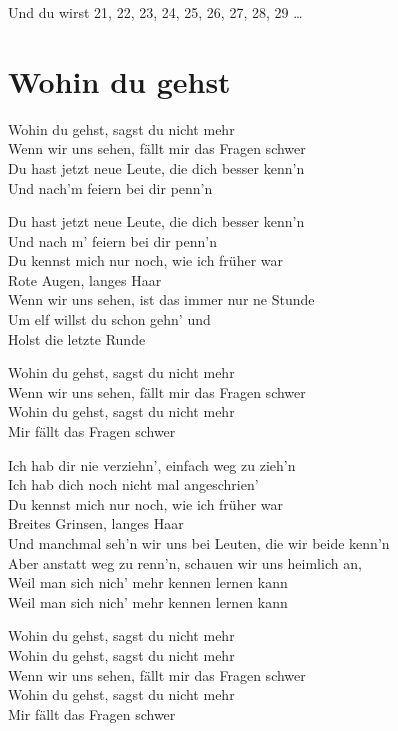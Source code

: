 \documentclass[]{book}
\begin{document}
Und du wirst 21, 22, 23, 24, 25, 26, 27, 28, 29 \ldots{}

\hypertarget{wohin-du-gehst-2}{%
\section{Wohin du gehst}\label{wohin-du-gehst-2}}

Wohin du gehst, sagst du nicht mehr\\
Wenn wir uns sehen, fällt mir das Fragen schwer\\
Du hast jetzt neue Leute, die dich besser kenn'n\\
Und nach'm feiern bei dir penn'n

Du hast jetzt neue Leute, die dich besser kenn'n\\
Und nach m' feiern bei dir penn'n\\
Du kennst mich nur noch, wie ich früher war\\
Rote Augen, langes Haar\\
Wenn wir uns sehen, ist das immer nur ne Stunde\\
Um elf willst du schon gehn' und\\
Holst die letzte Runde

Wohin du gehst, sagst du nicht mehr\\
Wenn wir uns sehen, fällt mir das Fragen schwer\\
Wohin du gehst, sagst du nicht mehr\\
Mir fällt das Fragen schwer

Ich hab dir nie verziehn', einfach weg zu zieh'n\\
Ich hab dich noch nicht mal angeschrien'\\
Du kennst mich nur noch, wie ich früher war\\
Breites Grinsen, langes Haar\\
Und manchmal seh'n wir uns bei Leuten, die wir beide kenn'n\\
Aber anstatt weg zu renn'n, schauen wir uns heimlich an,\\
Weil man sich nich' mehr kennen lernen kann\\
Weil man sich nich' mehr kennen lernen kann

Wohin du gehst, sagst du nicht mehr\\
Wohin du gehst, sagst du nicht mehr\\
Wenn wir uns sehen, fällt mir das Fragen schwer\\
Wohin du gehst, sagst du nicht mehr\\
Mir fällt das Fragen schwer
\end{document}
